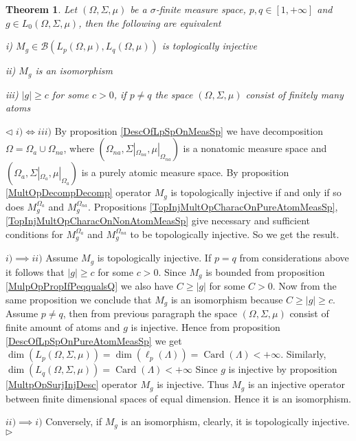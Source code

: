 \documentclass[12pt]{article}
\newtheorem{theorem}{Theorem}[subsection]
\newenvironment{proof}{\par $\triangleleft$}{$\triangleright$}
\begin{document}
\begin{theorem}\label{TopInjMultOpCharacOnMeasSp} Let $(\Omega,\Sigma,\mu)$ be a $\sigma$-finite measure space, $p,q\in[1,+\infty]$ and $g\in L_0(\Omega,\Sigma,\mu)$, then the following are equivalent

i) $M_g\in\mathcal{B}(L_p(\Omega,\mu),L_q(\Omega,\mu))$ is toplogically injective

ii) $M_g$ is an isomorphism

iii) $|g|\geq c$ for some $c>0$, if $p\neq q$ the space $(\Omega,\Sigma,\mu)$ consist of finitely many atoms
\end{theorem}
\begin{proof} $i)\Longleftrightarrow iii)$ By proposition \ref{DescOfLpSpOnMeasSp} we have decomposition $\Omega=\Omega_{a}\cup\Omega_{na}$, where $(\Omega_{na},\Sigma|_{\Omega_{na}},\mu|_{\Omega_{na}})$ is a nonatomic measure space and $(\Omega_{a},\Sigma|_{\Omega_{a}},\mu|_{\Omega_{a}})$ is a purely atomic measure space. By proposition \ref{MultOpDecompDecomp} operator $M_g$ is topologically injective if and only if so does $M_g^{\Omega_{a}}$ and $M_g^{\Omega_{na}}$. Propositions \ref{TopInjMultOpCharacOnPureAtomMeasSp}, \ref{TopInjMultOpCharacOnNonAtomMeasSp} give necessary and sufficient conditions for $M_g^{\Omega_{a}}$ and $M_g^{\Omega_{na}}$ to be topologically injective. So we get the result.

$i)\implies ii)$ Assume $M_g$ is topologically injective. If $p=q$ from considerations above it follows that $|g|\geq c$ for some $c>0$. Since $M_g$ is bounded from proposition \ref{MulpOpPropIfPeqqualsQ} we also have $C\geq |g|$ for some $C>0$. Now from the same proposition we conclude that $M_g$ is an isomorphism because $C\geq|g|\geq c$. Assume $p\neq q$, then from previous paragraph the space $(\Omega,\Sigma,\mu)$ consist of finite amount of atoms and $g$ is injective. Hence from proposition \ref{DescOfLpSpOnPureAtomMeasSp} we get $\operatorname{dim}(L_p(\Omega,\Sigma,\mu))=\operatorname{dim}(\ell_p(\Lambda))=\operatorname{Card}(\Lambda)<+\infty$. Similarly, $\operatorname{dim}(L_q(\Omega,\Sigma,\mu))=\operatorname{Card}(\Lambda)<+\infty$ Since $g$ is injective by proposition \ref{MultpOpSurjInjDesc} operator $M_g$ is injective. Thus $M_g$ is an injective operator between finite dimensional spaces of equal dimension. Hence it is an isomorphism.

$ii)\implies i)$ Conversely, if $M_g$ is an isomorphism, clearly, it is topologically injective.
\end{proof}
\end{document}
